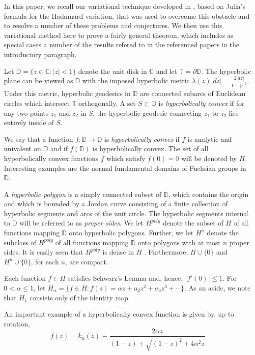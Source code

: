 \documentclass[final]{siamltex}
\newcommand{\C}{\mathbb{C}}
\newcommand{\T}{\mathbb{T}}
\newcommand{\D}{\mathbb{D}}
\begin{document}
In this paper, we recall our variational technique developed in \cite{bw03}, based on Julia's formula for the Hadamard variation,  that was used to overcome this obstacle and to resolve a number of these problems and conjectures.  We then use this variational method here to prove a fairly general theorem, which includes as special cases a number of the results refered to in the referenced papers in the introductory paragraph.

Let $\D = \{ z \in \C : |z| < 1 \}$ denote the unit disk in $\C$ and let $\T = \partial \D$.  The hyperbolic plane can be viewed as $\D$ with the imposed hyperbolic metric ${\lambda(z)|dz| = \frac{2|dz|}{1 - |z|^2}}$.  Under this metric, hyperbolic geodesics in $\D$ are connected subarcs of Euclidean circles which intersect $\T$ orthogonally.  A set  $S \subset \D$ is {\it hyperbolically convex} if for any two points $z_1$ and $z_2$ in $S$, the hyperbolic geodesic connecting $z_1$ to $z_2$ lies entirely inside of $S$.

We say that a function $f : \D \rightarrow \D$ is {\it hyperbolically convex} if $f$ is analytic and univalent on $\D$ and if $f(\D)$ is hyperbolically convex.  The set of all hyperbolically convex functions $f$ which satisfy $f(0) = 0$ will be denoted by $H$.  Interesting examples are the normal fundamental domains of Fuchsian groups in $\D$.

A {\it hyperbolic polygon} is a simply connected subset of $\D$, which contains the origin and which is bounded by a Jordan curve consisting of a finite collection of hyperbolic segments and arcs of the unit circle.  The hyperbolic segments internal to $\D$ will be referred to as {\it proper sides}.  We let $H^{poly}$ denote the subset of $H$ of all functions mapping $\D$ onto hyperbolic polygons. Further, we let $H^n$ denote the subclass of $H^{poly}$ of all functions mapping $\D$ onto polygons with at most $n$ proper sides. It is easily seen that $H^{poly}$ is dense in $H$ .  Furthermore, $H \cup \{0\}$ and $H^n \cup \{0\}$, for each $n$, are compact.

Each function $f \in H$ satisfies Schwarz's Lemma and, hence, $|f'(0)| \le
1$.  For $0 < \alpha \le 1$, let $H_{\alpha} = \{f \in H : f(z) = \alpha z + a_2z^2 +
a_3z^3 + \cdots \}$.  As an aside, we note that $H_1$ consists only of the identity map.

An important example of a hyperbolically convex function is given by, up to rotation, 
\begin{equation}\label{kalpha}
f(z) = k_{\alpha}(z) \equiv \frac{2\alpha z}{(1-z)+ \sqrt{(1-z)^2 + 4\alpha^2z}}
\end{equation}
\end{document}
